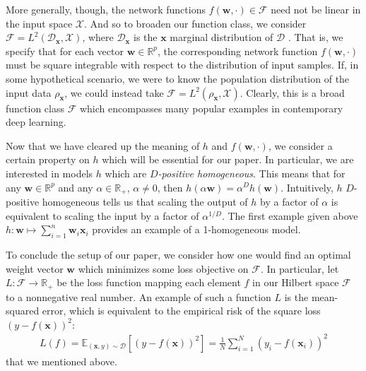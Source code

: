 \documentclass{article}
\begin{document}
More generally, though, the network functions $f(\boldsymbol{w}, \cdot) \in \mathcal{F}$ need not be linear in the input space $\mathcal{X}$. And so to broaden our function class, we consider $\mathcal{F} = L^2(\mathcal{D}_{\boldsymbol{x}}, \mathcal{X})$, where $\mathcal{D}_{\boldsymbol{x}}$ is the $\boldsymbol{x}$ marginal distribution of $\mathcal{D}$ \cite{chizat2018lazy}. That is, we specify that for each vector $\boldsymbol{w} \in \mathbb{R}^p$, the corresponding network function $f(\boldsymbol{w}, \cdot)$ must be square integrable with respect to the distribution of input samples. If, in some hypothetical scenario, we were to know the population distribution of the input data $\mathcal{\rho_{\boldsymbol{x}}}$, we could instead take $\mathcal{F} = L^2(\rho_{\boldsymbol{x}}, \mathcal{X})$. Clearly, this is a broad function class $\mathcal{F}$ which encompasses many popular examples in contemporary deep learning.

Now that we have cleared up the meaning of $h$ and $f(\boldsymbol{w}, \cdot)$, we consider a certain property on $h$ which will be essential for our paper. In particular, we are interested in models $h$ which are \textit{$D$-positive homogeneous}. This means that for any $\boldsymbol{w} \in \mathbb{R}^p$ and any $\alpha \in \mathbb{R}_+$, $\alpha \neq 0$, then $h(\alpha \boldsymbol{w}) = \alpha^D h(\boldsymbol{w})$. Intuitively, $h$ $D$-positive homogeneous tells us that scaling the output of $h$ by a factor of $\alpha$ is equivalent to scaling the input by a factor of $\alpha^{1/D}$. The first example given above $h: \boldsymbol{w} \mapsto \sum_{i=1}^n \boldsymbol{w}_i \boldsymbol{x}_i$ provides an example of a 1-homogeneous model.

To conclude the setup of our paper, we consider how one would find an optimal weight vector $\boldsymbol{w}$ which minimizes some loss objective on $\mathcal{F}$. In particular, let $L: \mathcal{F} \rightarrow \mathbb{R}_+$ be the loss function mapping each element $f$ in our Hilbert space $\mathcal{F}$ to a nonnegative real number. An example of such a function $L$ is the mean-squared error, which is equivalent to the empirical risk of the square loss $(y - f(\boldsymbol{x}))^2$:
\begin{align}
   L(f) = \mathbb{E}_{(\boldsymbol{x}, y) \sim \mathcal{D}} \left[ \left(y - f(\boldsymbol{x}) \right)^2 \right] = \frac{1}{N}\sum_{i=1}^N (y_i - f(\boldsymbol{x}_i))^2\label{mse}
\end{align}
that we mentioned above. 
\end{document}
